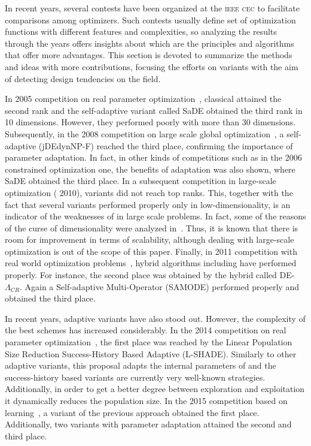 In recent years, several contests have been organized at the \textsc{ieee cec} to facilitate comparisons among optimizers.
%
Such contests usually define set of optimization functions with different features and complexities, so analyzing the results
through the years offers insights about which are the principles and algorithms that offer more advantages.
%
This section is devoted to summarize the methods and ideas with more contributions, focusing the efforts
on \DE{} variants with the aim of detecting design tendencies on the \DE{} field. 

In \CEC{} 2005 competition on real parameter optimization~\cite{CEC2005}, classical \DE{} attained the second rank and 
the self-adaptive \DE{} variant called SaDE obtained the third rank in 10 dimensions.
%
However, they performed poorly with more than 30 dimensions.
%
Subsequently, in the 2008 competition on large scale global optimization~\cite{CEC2008}, a self-adaptive \DE{} (jDEdynNP-F) 
reached the third place, confirming the importance of parameter adaptation.
%
In fact, in other kinds of competitions such as in the 2006 constrained optimization one, the benefits of adaptation 
was also shown, where SaDE obtained the third place.
%
In a subsequent competition in large-scale optimization (\CEC{} 2010), \DE{} variants did not reach top ranks.
%
This, together with the fact that several \DE{} variants performed properly only in low-dimensionality, 
is an indicator of the weaknesses of \DE{} in large scale problems.
%
In fact, some of the reasons of the curse of dimensionality were analyzed in~\cite{segura2015improving}.
%
Thus, it is known that there is room for improvement in terms of scalability, although dealing with large-scale optimization is out of 
the scope of this paper.
%
Finally, in \CEC{} 2011 competition with real world optimization problems~\cite{CEC2011}, hybrid algorithms including \DE{} have performed
properly.
%
For instance, the second place was obtained by the hybrid \DE{} called DE-$\Lambda_{CR}$.
%
Again a Self-adaptive Multi-Operator \DE{} (SAMODE) performed properly and obtained the third place.

In recent years, adaptive variants have also stood out.
%
However, the complexity of the best schemes has increased considerably.
%
In the 2014 competition on real parameter optimization~\cite{CEC2014}, the first place was reached by the Linear Population Size 
Reduction Success-History Based Adaptive \DE{} (L-SHADE).
%
Similarly to other adaptive variants, this proposal adapts the internal parameters of \DE{} and the success-history based variants
are currently very well-known strategies.
%
Additionally, in order to get a better degree between exploration and exploitation it dynamically reduces the population size.
%
In the 2015 competition based on learning~\cite{CEC2015}, a variant of the previous approach obtained the first place.
%
Additionally, two \DE{} variants with parameter adaptation attained the second and third place.

